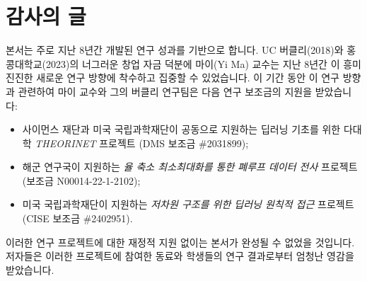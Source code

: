 \documentclass[../../book-main_ko.tex]{subfiles}
\begin{document}
\chapter*{감사의 글}
본서는 주로 지난 8년간 개발된 연구 성과를 기반으로 합니다. UC 버클리(2018)와 홍콩대학교(2023)의 너그러운 창업 자금 덕분에 마이(Yi Ma) 교수는 지난 8년간 이 흥미진진한 새로운 연구 방향에 착수하고 집중할 수 있었습니다. 이 기간 동안 이 연구 방향과 관련하여 마이 교수와 그의 버클리 연구팀은 다음 연구 보조금의 지원을 받았습니다:
\begin{itemize}
    \item 사이먼스 재단과 미국 국립과학재단이 공동으로 지원하는 딥러닝 기초를 위한 다대학 {\em THEORINET} 프로젝트 (DMS 보조금 \#2031899);
    \item 해군 연구국이 지원하는 {\em 율 축소 최소최대화를 통한 폐루프 데이터 전사} 프로젝트 (보조금 N00014-22-1-2102);
    \item 미국 국립과학재단이 지원하는 {\em 저차원 구조를 위한 딥러닝 원칙적 접근} 프로젝트 (CISE 보조금 \#2402951).
\end{itemize}
이러한 연구 프로젝트에 대한 재정적 지원 없이는 본서가 완성될 수 없었을 것입니다. 저자들은 이러한 프로젝트에 참여한 동료와 학생들의 연구 결과로부터 엄청난 영감을 받았습니다.
\end{document}
